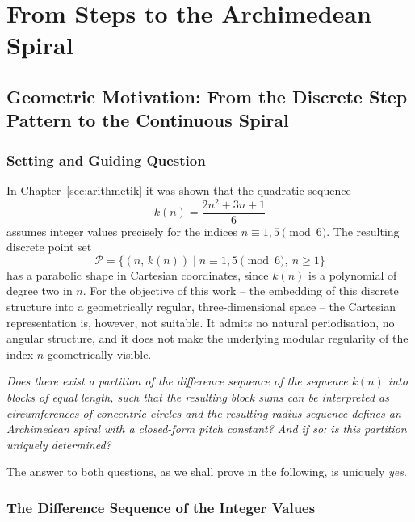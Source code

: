 \chapter{From Steps to the Archimedean Spiral}\label{sec:spirale}

\section{Geometric Motivation: From the Discrete Step Pattern to the
Continuous Spiral}

\subsection{Setting and Guiding Question}

In Chapter~\ref{sec:arithmetik} it was shown that the quadratic sequence
\[
  k(n) = \frac{2n^2 + 3n + 1}{6}
\]
assumes integer values precisely for the indices $n \equiv 1, 5 \pmod{6}$.
The resulting discrete point set
\[
  \mathcal{P} = \bigl\{(n,\, k(n)) \mid n \equiv 1, 5 \pmod{6},\ n \geq 1\bigr\}
\]
has a parabolic shape in Cartesian coordinates, since $k(n)$
is a polynomial of degree two in $n$. For the objective of this work --
the embedding of this discrete structure into a geometrically regular,
three-dimensional space -- the Cartesian representation is, however, not
suitable. It admits no natural periodisation, no
angular structure, and it does not make the underlying modular regularity
of the index $n$ geometrically visible.

\begin{tcolorbox}[
  title={Guiding question of this chapter},
  colback=gray!5,
  colframe=gray!50!black,
  enhanced,
  breakable
]
\emph{Does there exist a partition of the difference sequence of the sequence $k(n)$
into blocks of equal length, such that the resulting block sums can be interpreted as circumferences
of concentric circles and the resulting radius sequence
defines an Archimedean spiral with a closed-form pitch constant?
And if so: is this partition uniquely determined?}
\end{tcolorbox}

The answer to both questions, as we shall prove in the following, is
uniquely \emph{yes}.

\subsection{The Difference Sequence of the Integer Values}
\label{subsec:differenzstruktur}

